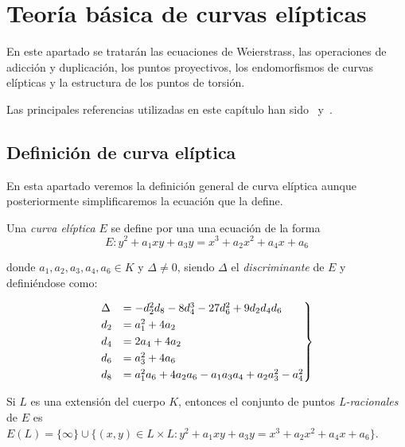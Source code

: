 \section{Teoría básica de curvas elípticas}
\label{sec:Teoría básica de curvas elípticas}

En este apartado se tratarán las ecuaciones de Weierstrass, las operaciones de adicción y duplicación, los puntos proyectivos, los endomorfismos de curvas elípticas y la estructura de los puntos de torsión.

Las principales referencias utilizadas en este capítulo han sido~\cite[cap. 2]{Washington:2008} y~\cite[cap. 3]{Hankerson:2003}.

\subsection{Definición de curva elíptica}
\label{sub:Definición de curva elíptica}

En esta apartado veremos la definición general de curva elíptica aunque posteriormente simplificaremos la ecuación que la define.

\begin{definicion}
\label{def:curva elíptica}
	Una \emph{curva elíptica} $E$ se define por una una ecuación de la forma
	\begin{equation}
	\label{eq:Weierstrass general}
		E : y^2 + a_1 x y + a_3 y = x^3 + a_2 x^2 + a_4 x + a_6
	\end{equation}

	donde $a_1, a_2, a_3, a_4, a_6 \in K$ y $\Delta \neq 0$, siendo $\Delta$ el \emph{discriminante} de $E$ y definiéndose como:

	\begin{align}
		\label{eq:discriminante}
		\begin{rcases}
		\Delta & = -d_2^2 d_8 - 8 d_4^3 - 27 d_6^2 + 9 d_2 d_4 d_6         \\
		d_2    & = a_1^2 + 4 a_ 2                                          \\
		d_4    & = 2 a_4 + 4 a_2                                           \\
		d_6    & = a_3^2 + 4 a_6                                           \\
		d_8    & = a_1^2 a_6 + 4 a_2 a_6 - a_1 a_3 a_4 + a_2 a_3^2 - a_4^2 \\
		\end{rcases}
	\end{align}

	Si $L$ es una extensión del cuerpo $K$, entonces el conjunto de puntos \emph{L-racionales} de $E$ es $E(L) = \{\infty\} \cup \{(x, y) \in L \times L: y^2 + a_1 x y + a_3 y = x^3 + a_2 x^2 + a_4 x + a_6 \}$.
\end{definicion}

